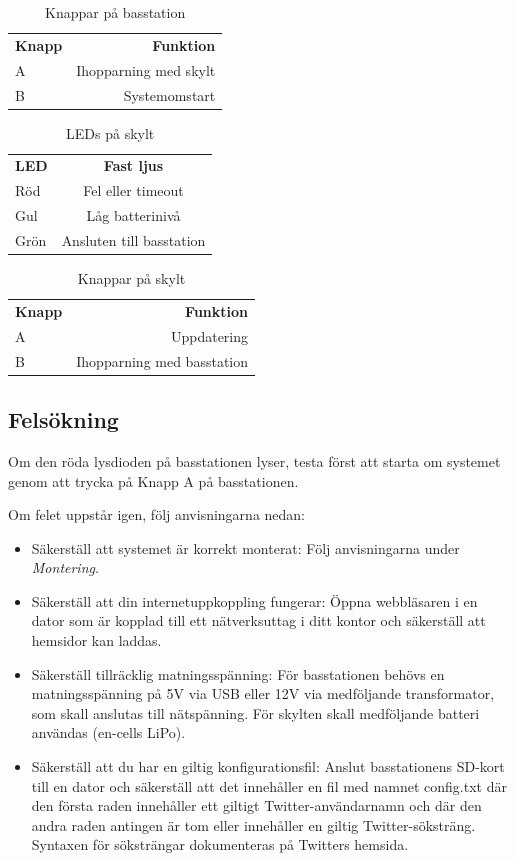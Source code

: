 \documentclass[a4paper,11pt]{article}
\begin{document}
\begin{table}[h!]
\centering
    \begin{tabular}{|l|r|}
    {\bf Knapp} & {\bf Funktion} \\
    A & Ihopparning med skylt \\
    B & Systemomstart \\
    \end{tabular}
\caption{Knappar på basstation}
\label{tab:btntable_base}
\end{table}

\begin{table}[h!]
\centering
    \begin{tabular}{|l|c|}
    {\bf LED} & {\bf Fast ljus}  \\
    Röd & Fel eller timeout \\
    Gul & Låg batterinivå \\
    Grön & Ansluten till basstation \\
    \end{tabular}
\caption{LEDs på skylt}
\label{tab:ledtable_skylt}
\end{table}

\begin{table}[h!]
\centering
    \begin{tabular}{|l|r|}
    {\bf Knapp} & {\bf Funktion} \\
    A & Uppdatering \\
    B & Ihopparning med basstation \\
    \end{tabular}
\caption{Knappar på skylt}
\label{tab:btntable_skylt}
\end{table}

\subsection{Felsökning}

Om den röda lysdioden på basstationen lyser, testa först att starta om systemet genom att trycka på Knapp A på basstationen.

Om felet uppstår igen, följ anvisningarna nedan:
\begin{itemize}
\item Säkerställ att systemet är korrekt monterat: Följ anvisningarna under {\it Montering}.
\item Säkerställ att din internetuppkoppling fungerar: Öppna webbläsaren i en dator som är kopplad till ett nätverksuttag i ditt kontor och säkerställ att hemsidor kan laddas.
\item Säkerställ tillräcklig matningsspänning: För basstationen behövs en matningsspänning på 5V via USB eller 12V via medföljande transformator, som skall anslutas till nätspänning. För skylten skall medföljande batteri användas (en-cells LiPo).
\item Säkerställ att du har en giltig konfigurationsfil: Anslut basstationens SD-kort till en dator och säkerställ att det innehåller en fil med namnet config.txt där den första raden innehåller ett giltigt Twitter-användarnamn och där den andra raden antingen är tom eller innehåller en giltig Twitter-söksträng. Syntaxen för söksträngar dokumenteras på Twitters hemsida.
\end{itemize}
\end{document}

